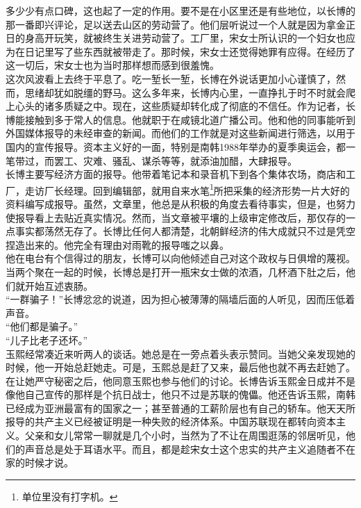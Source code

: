 多少少有点口碑，这也起了一定的作用。要不是在小区里还是有些地位，以长博的那一番即兴评论，足以送去山区的劳动营了。他们层听说过一个人就是因为拿金正日的身高开玩笑，就被终生关进劳动营了。工厂里，宋女士所认识的一个妇女也应为在日记里写了些东西就被带走了。那时候，宋女士还觉得她罪有应得。在经历了这一切后，宋女士也为当时那样想而感到很羞愧。\\

这次风波看上去终于平息了。吃一堑长一堑，长博在外说话更加小心谨慎了，然而，思绪却犹如脱缰的野马。这么多年来，长博内心里，一直挣扎于时不时就会爬上心头的诸多质疑之中。现在，这些质疑却转化成了彻底的不信任。作为记者，长博能接触到多于常人的信息。他就职于在咸镜北道广播公司。他和他的同事能听到外国媒体报导的未经审查的新闻。而他们的工作就是对这些新闻进行筛选，以用于国内的宣传报导。资本主义好的一面，特别是南韩1988年举办的夏季奥运会，都一笔带过，而罢工、灾难、骚乱、谋杀等等，就添油加醋，大肆报导。\\

长博主要写经济方面的报导。他带着笔记本和录音机下到各个集体农场，商店和工厂，走访厂长经理。回到编辑部，就用自来水笔\footnote{单位里没有打字机。}所把采集的经济形势一片大好的资料编写成报导。虽然，文章里，他总是从积极的角度去看待事实，但是，也努力使报导看上去贴近真实情况。然而，当文章被平壤的上级审定修改后，那仅存的一点事实都荡然无存了。长博比任何人都清楚，北朝鲜经济的伟大成就只不过是凭空捏造出来的。他完全有理由对雨靴的报导嗤之以鼻。\\

他在电台有个信得过的朋友，长博可以向他倾述自己对这个政权与日俱增的蔑视。当两个聚在一起的时候，长博总是打开一瓶宋女士做的浓酒，几杯酒下肚之后，他们就开始互述衷肠。\\

“一群骗子！”长博忿忿的说道，因为担心被薄薄的隔墙后面的人听见，因而压低着声音。\\

“他们都是骗子。”\\

“儿子比老子还坏。”\\

玉熙经常凑近来听两人的谈话。她总是在一旁点着头表示赞同。当她父亲发现她的时候，他一开始总赶她走。可是，玉熙总是赶了又来，最后他也就不再去赶她了。在让她严守秘密之后，他同意玉熙也参与他们的讨论。长博告诉玉熙金日成并不是像他自己宣传的那样是个抗日战士，他只不过是苏联的傀儡。他还告诉玉熙，南韩已经成为亚洲最富有的国家之一；甚至普通的工薪阶层也有自己的轿车。他天天所报导的共产主义已经被证明是一种失败的经济体系。中国苏联现在都转向资本主义。父亲和女儿常常一聊就是几个小时，当然为了不让在周围逛荡的邻居听见，他们的声音总是处于耳语水平。而且，都是趁宋女士这个忠实的共产主义追随者不在家的时候才说。\\
